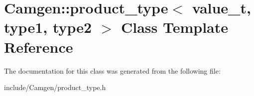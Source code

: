 \hypertarget{a00432}{\section{Camgen\-:\-:product\-\_\-type$<$ value\-\_\-t, type1, type2 $>$ Class Template Reference}
\label{a00432}
}


The documentation for this class was generated from the following file\-:\begin{DoxyCompactItemize}
\item 
include/\-Camgen/product\-\_\-type.\-h\end{DoxyCompactItemize}
